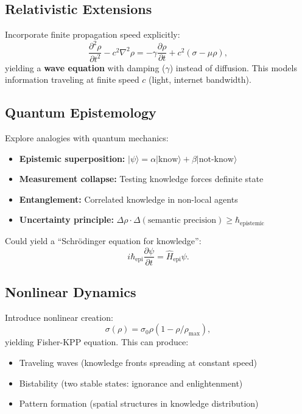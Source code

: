 \documentclass[12pt]{article}
\begin{document}
\subsection{Relativistic Extensions}

Incorporate finite propagation speed explicitly:
\begin{equation}
    \frac{\partial^2 \rho}{\partial t^2} - c^2 \nabla^2 \rho = -\gamma \frac{\partial \rho}{\partial t} + c^2(\sigma - \mu\rho),
\end{equation}
yielding a \textbf{wave equation} with damping ($\gamma$) instead of diffusion. This models information traveling at finite speed $c$ (light, internet bandwidth).

\subsection{Quantum Epistemology}

Explore analogies with quantum mechanics:
\begin{itemize}
    \item \textbf{Epistemic superposition:} $|\psi\rangle = \alpha|\text{know}\rangle + \beta|\text{not-know}\rangle$
    \item \textbf{Measurement collapse:} Testing knowledge forces definite state
    \item \textbf{Entanglement:} Correlated knowledge in non-local agents
    \item \textbf{Uncertainty principle:} $\Delta \rho \cdot \Delta(\text{semantic precision}) \geq \hbar_{\text{epistemic}}$
\end{itemize}

Could yield a ``Schrödinger equation for knowledge'':
\begin{equation}
    i\hbar_{\text{epi}} \frac{\partial \psi}{\partial t} = \hat{H}_{\text{epi}} \psi.
\end{equation}

\subsection{Nonlinear Dynamics}

Introduce nonlinear creation:
\begin{equation}
    \sigma(\rho) = \sigma_0 \rho (1 - \rho/\rho_{\max}),
\end{equation}
yielding Fisher-KPP equation. This can produce:
\begin{itemize}
    \item Traveling waves (knowledge fronts spreading at constant speed)
    \item Bistability (two stable states: ignorance and enlightenment)
    \item Pattern formation (spatial structures in knowledge distribution)
\end{itemize}
\end{document}
